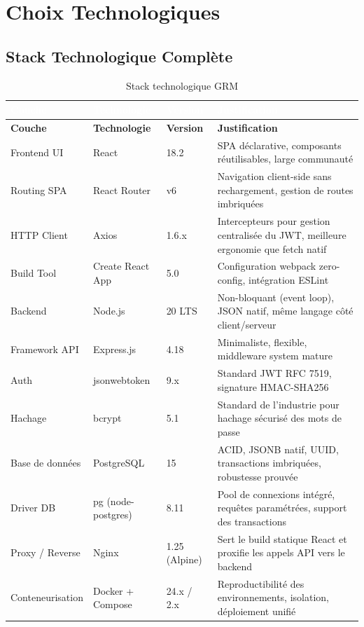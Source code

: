 \documentclass[12pt,a4paper]{report}
\begin{document}
\chapter{Choix Technologiques}

\section{Stack Technologique Complète}

\begin{longtable}{|L{2.5cm}|L{2.5cm}|L{3.5cm}|L{5cm}|}
\caption{Stack technologique GRM} \\
\hline
{}\textcolor{white}{\textbf{Couche}} & \textcolor{white}{\textbf{Technologie}} & \textcolor{white}{\textbf{Version}} & \textcolor{white}{\textbf{Justification}} \\
\hline
\endfirsthead
\hline
\textbf{Couche} & \textbf{Technologie} & \textbf{Version} & \textbf{Justification} \\
\hline
\endhead
Frontend UI & React & 18.2 & SPA déclarative, composants réutilisables, large communauté \\
\hline
Routing SPA & React Router & v6 & Navigation client-side sans rechargement, gestion de routes imbriquées \\
\hline
HTTP Client & Axios & 1.6.x & Intercepteurs pour gestion centralisée du JWT, meilleure ergonomie que fetch natif \\
\hline
Build Tool & Create React App & 5.0 & Configuration webpack zero-config, intégration ESLint \\
\hline
Backend & Node.js & 20 LTS & Non-bloquant (event loop), JSON natif, même langage côté client/serveur \\
\hline
Framework API & Express.js & 4.18 & Minimaliste, flexible, middleware system mature \\
\hline
Auth & jsonwebtoken & 9.x & Standard JWT RFC 7519, signature HMAC-SHA256 \\
\hline
Hachage & bcrypt & 5.1 & Standard de l'industrie pour hachage sécurisé des mots de passe \\
\hline
Base de données & PostgreSQL & 15 & ACID, JSONB natif, UUID, transactions imbriquées, robustesse prouvée \\
\hline
Driver DB & pg (node-postgres) & 8.11 & Pool de connexions intégré, requêtes paramétrées, support des transactions \\
\hline
Proxy / Reverse & Nginx & 1.25 (Alpine) & Sert le build statique React et proxifie les appels API vers le backend \\
\hline
Conteneurisation & Docker + Compose & 24.x / 2.x & Reproductibilité des environnements, isolation, déploiement unifié \\
\hline
\end{longtable}
\end{document}
